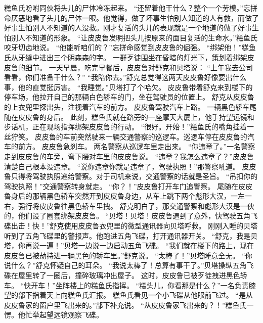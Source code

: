 \documentclass[a4paper,12pt,UTF8,twoside]{ctexbook}
\begin{document}
        糕鱼氏吩咐同伙将头儿的尸体冷冻起来。 
        “还留着他干什么？整个一个劳模。”忘拼命厌恶地看了头儿的尸体一眼。他觉得，做了坏事生怕别人知道的人有救，而做了好事生怕别人不知道的人没救。刚才复活的头儿的表现就是一个地道的做了好事生怕别人不知道的形象。 
        “让皮皮鲁发明把头儿按原来的面目复活的生命水。”糕鱼氏咬牙切齿地说。 
        “他能听咱们的？”忘拼命感觉到皮皮鲁的倔强。 
        “绑架他！”糕鱼氏从牙缝中进出三个阴森森的字。 
        一群歹徒围坐在昏暗的灯光下，策划着绑架皮皮鲁的细节。 
        一天早晨，吃完早餐后，皮皮鲁对舒克和贝塔说： 
        “上午我去公司看看，你们准备干什么？” 
        “我陪你去。”舒克总觉得这两天皮皮鲁好像要出什么事，他的直觉挺厉害。 
        “我睡觉。”贝塔打了个哈欠。 
        皮皮鲁带着舒克来到楼下的停车场，他拉开自己的那辆白色轿车的门，坐在驾驶员的位置上。 
        舒克从皮皮鲁的上衣兜里探出头，注视着汽车的前方。 
        皮皮鲁驾驶汽车上路。 
        一辆黑色轿车尾随在皮皮鲁的身后。 
        此刻，糕鱼氏就在路旁的一座摩天大厦上，他手持望远镜和步话机，正在现场指挥绑架皮皮鲁的行动。 
        “很好。开始！”糕鱼氏的嘴角挂着一丝狞笑。 
        皮皮鲁的车前突然驶来一辆交通警察的巡逻车。巡逻车停在皮皮鲁的汽车的前方。 
        皮皮鲁急刹车。 
        两名警察从巡逻车里走出来。 
        “你违章了。”一名警察走到皮皮鲁的车旁，弯下腰对车里的皮皮鲁说。 
        “违章？我怎么违章了？”皮皮鲁清楚自己根本没违章。 
        “说你违章你就是违章了，驾驶执照！”那警察吼道。 
        皮皮鲁只得将驾驶执照递给警察。对于司机来说，交通警察的话就是圣旨。 
        “吊扣你的驾驶执照！”交通警察转身就走。 
        “你？！''皮皮鲁打开车门追警察。 
        尾随在皮皮鲁身后的那辆黑色轿车突然开到皮皮鲁身边，从车上跳下两个彪形大汉，一左一右，强行将皮皮鲁往黑色轿车里拽。 
        舒克明白了，那交通警察和彪形大汉是一伙的，他们设了圈套绑架皮皮鲁。 
        “贝塔！贝塔！皮皮鲁遇到了意外，快驾驶五角飞碟出击！快！”舒克使用皮皮鲁衣兜里的微型通讯器向贝塔呼救。 
        刚刚入睡的贝塔听到了五角飞碟里的警报声。他跑进五角飞碟，打开通讯器开关。 
        “舒克，我是贝塔，你再说一遍！”贝塔一边说一边启动五角飞碟。 
        “我们就在楼下的路上，现在皮皮鲁已被劫持进一辆黑色的轿车里。”舒克说。 
        “太棒了！”贝塔睡意全无。 
        “你说什么？”舒克怀疑自己的耳朵。 
        “我说太棒了！总算有事干了。”贝塔操纵五角飞碟在屋里转了一圈后，撞碎玻璃冲出屋子。 
        这时，皮皮鲁已被歹徒拽进黑色轿车。 
        “快开车！”坐阵楼上的糕鱼氏指挥。 
        “糕头儿，你看那是什么？”一名负责膝望的部下指着天上向糕鱼氏汇报。 
        糕鱼氏看见一个小飞碟从他眼前飞过。 
        “是从皮皮鲁家的窗户里飞出来的。”部下补充说。 
        “从皮皮鲁家飞出来的？！”糕鱼氏一愣。他忙举起望远镜观察飞碟。 
\end{document}
